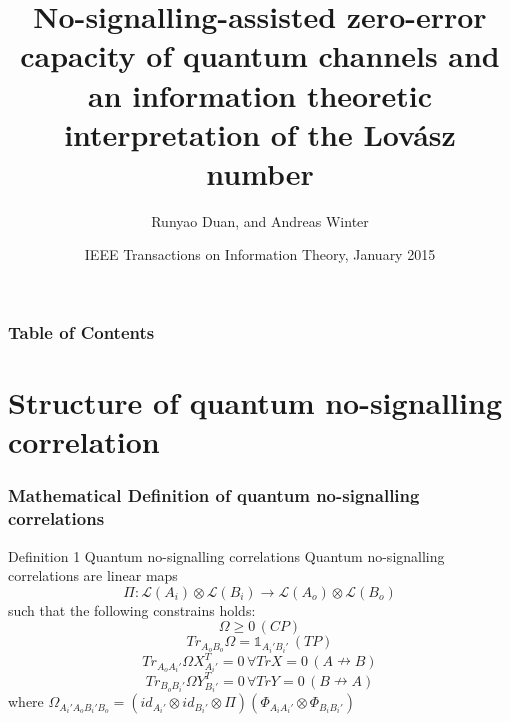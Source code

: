 \documentclass{beamer}
\title[NSQC and Lovasz number] %
{No-signalling-assisted zero-error capacity of quantum channels and an information theoretic interpretation of the Lov\'{a}sz number}
\subtitle{}
\author[R. Duan and A. Winter] %
{Runyao Duan, and Andreas Winter}
\institute[] %
{
}
\date[IEEE 2015] %
{IEEE Transactions on Information Theory, January 2015}
\begin{document}
\frame{\titlepage}


\begin{frame}
\frametitle{Table of Contents}
\tableofcontents

\end{frame}
\section{Structure of quantum no-signalling correlation}

\begin{frame}
\frametitle{Mathematical Definition of quantum no-signalling correlations}
\begin{block}{Definition 1 Quantum no-signalling correlations}
Quantum no-signalling correlations are linear maps
\[
\Pi : \mathcal{L}(A_i)\otimes \mathcal{L}(B_i)\rightarrow \mathcal{L}(A_o)\otimes \mathcal{L}(B_o)
\]
such that the following constrains holds:
\[
\Omega \geq 0 \,(CP)
\]
\[
Tr_{A_o B_o}\Omega = \mathds{1}_{A_i'B_i'} \, (TP)
\]
\[
Tr_{A_o A_i'}\Omega X_{A_i'}^T=0\, \forall TrX=0 \, (A \nrightarrow B)
\]
\[
Tr_{B_o B_i'}\Omega Y_{B_i'}^T=0\, \forall TrY=0 \, (B \nrightarrow A)
\]
where $\Omega_{A_i'A_oB_i'B_o} = (id_{A_i'}\otimes id_{B_i'}\otimes \Pi)(\Phi_{A_iA_i'}\otimes \Phi_{B_iB_i'})$

\end{block}

\end{frame}
\end{document}
